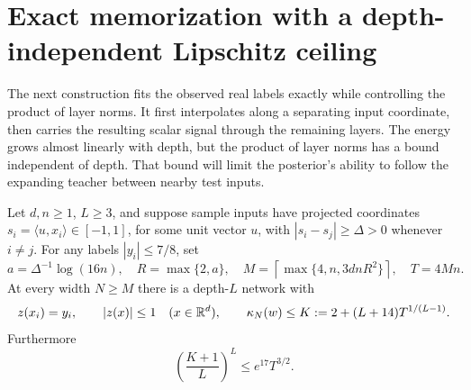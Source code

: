 \section{Exact memorization with a depth-independent Lipschitz ceiling}
\label{sec:memorization}
The next construction fits the observed real labels exactly while
controlling the product of layer norms. It first interpolates along a
separating input coordinate, then carries the resulting scalar signal
through the remaining layers. The energy grows almost linearly with
depth, but the product of layer norms has a bound independent of depth.
That bound will limit the posterior's ability to follow the expanding
teacher between nearby test inputs.

\begin{lemma}\label{lem:memorizer}
Let $d,n\ge1$, $L\ge3$, and suppose sample inputs have projected
coordinates $s_i=\langle u,x_i\rangle\in[-1,1]$, for some unit vector
$u$, with $|s_i-s_j|\ge\Delta>0$ whenever $i\ne j$.
For any labels $|y_i|\le7/8$, set
\[
 a=\Delta^{-1}\log(16n),\quad R=\max\{2,a\},\quad
 M=\left\lceil\max\{4,n,3dnR^2\}\right\rceil,\quad T=4Mn.
\]
At every width $N\ge M$ there is a depth-$L$ network with
\[
 z(x_i)=y_i,\qquad |z(x)|\le1\quad(x\in\mathbb R^d),\qquad
 \kappa_N(w)\le K:=2+(L+14)T^{1/(L-1)}.
\]
Furthermore
\begin{equation}\label{eq:product-bound}
 \left(\frac{K+1}{L}\right)^L\le e^{17}T^{3/2}.
\end{equation}
\end{lemma}
